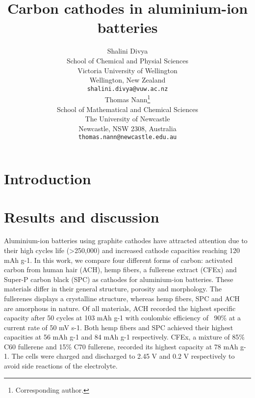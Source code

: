 \documentclass{article}
\title{Carbon cathodes in aluminium-ion batteries}
\author{
  Shalini Divya\\
  School of Chemical and Physial Sciences\\
  Victoria University of Wellington\\
  Wellington, New Zealand\\
  \texttt{shalini.divya@vuw.ac.nz}\\
   \And
  Thomas Nann\thanks{Corresponding author.}\\
  School of Mathematical and Chemical Sciences\\
  The University of Newcastle\\
  Newcastle, NSW 2308, Australia\\
  \texttt{thomas.nann@newcastle.edu.au}\\
}
\begin{document}
\maketitle

\begin{abstract}
\lipsum[1]
\end{abstract}



\section{Introduction}

\section{Results and discussion}
Aluminium-ion batteries using graphite cathodes have attracted attention due to their high cycles life (>250,000) and increased cathode capacities reaching 120 mAh g-1. In this work, we compare four different forms of carbon: activated carbon from human hair (ACH), hemp fibers, a fullerene extract (CFEx) and Super-P carbon black (SPC) as cathodes for aluminium-ion batteries. These materials differ in their general structure, porosity and morphology. The fullerenes displays a crystalline structure, whereas hemp fibers, SPC and ACH are amorphous in nature. Of all materials, ACH recorded the highest specific capacity after 50 cycles at 103 mAh g-1 with coulombic efficiency of ~90\% at a current rate of 50 mV s-1. Both hemp fibers and SPC achieved their highest capacities at 56 mAh g-1 and 84 mAh g-1 respectively. CFEx, a mixture of 85\% C60 fullerene and 15\% C70 fullerene, recorded its highest capacity at 78 mAh g-1. The cells were charged and discharged to 2.45 V and 0.2 V respectively to avoid side reactions of the electrolyte. 
\end{document}
